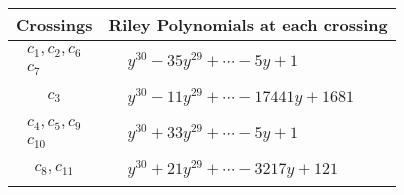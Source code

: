 \documentclass[1p]{elsarticle_modified}
\theoremstyle{definition}
\begin{document}
\begin{tabular}{m{50pt}|m{274pt}}
Crossings & \hspace{64pt}Riley Polynomials at each crossing \\
\hline $$\begin{aligned}c_{1},c_{2},c_{6}\\c_{7}\end{aligned}$$&$\begin{aligned}
&y^{30}-35 y^{29}+\cdots-5 y+1
\end{aligned}$\\
\hline $$\begin{aligned}c_{3}\end{aligned}$$&$\begin{aligned}
&y^{30}-11 y^{29}+\cdots-17441 y+1681
\end{aligned}$\\
\hline $$\begin{aligned}c_{4},c_{5},c_{9}\\c_{10}\end{aligned}$$&$\begin{aligned}
&y^{30}+33 y^{29}+\cdots-5 y+1
\end{aligned}$\\
\hline $$\begin{aligned}c_{8},c_{11}\end{aligned}$$&$\begin{aligned}
&y^{30}+21 y^{29}+\cdots-3217 y+121
\end{aligned}$\\
\hline
\end{tabular}
\vskip 2pc
\end{document}
